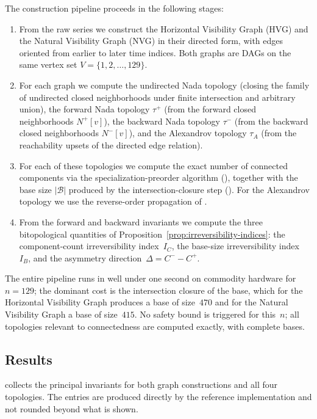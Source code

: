 \documentclass[11pt,a4paper]{article}
\theoremstyle{plain}
\theoremstyle{definition}
\newcommand{\Nfwd}[1]{N^{+}[#1]}
\newcommand{\Nbwd}[1]{N^{-}[#1]}
\newcommand{\taufwd}{\tau^{+}}
\newcommand{\taubwd}{\tau^{-}}
\newcommand{\base}{\mathcal{B}}
\begin{document}
The construction pipeline proceeds in the following stages:
\begin{enumerate}[label=(\roman*), leftmargin=2em]
\item From the raw series we construct the Horizontal Visibility Graph
(HVG) and the Natural Visibility Graph (NVG) in their directed form,
with edges oriented from earlier to later time indices. Both graphs are
DAGs on the same vertex set $V = \{1, 2, \ldots, 129\}$.
\item For each graph we compute the undirected Nada topology (closing
the family of undirected closed neighborhoods under finite intersection
and arbitrary union), the forward Nada topology $\taufwd$ (from the
forward closed neighborhoods $\Nfwd{v}$), the backward Nada topology
$\taubwd$ (from the backward closed neighborhoods $\Nbwd{v}$), and the
Alexandrov topology $\tau_A$ (from the reachability upsets of the
directed edge relation).
\item For each of these topologies we compute the exact number of
connected components via the specialization-preorder algorithm
(), together with the base size
$|\base|$ produced by the intersection-closure step
(). For the Alexandrov topology we use
the reverse-order propagation of
.
\item From the forward and backward invariants we compute the three
bitopological quantities of Proposition~\ref{prop:irreversibility-indices}:
the component-count irreversibility index~$I_C$, the base-size
irreversibility index~$I_B$, and the asymmetry direction~$\Delta = C^-
- C^+$.
\end{enumerate}
The entire pipeline runs in well under one second on commodity hardware
for $n = 129$; the dominant cost is the intersection closure of the base,
which for the Horizontal Visibility Graph produces a base of size~$470$
and for the Natural Visibility Graph a base of size~$415$. No safety
bound is triggered for this~$n$; all topologies relevant to connectedness
are computed exactly, with complete bases.

\subsection{Results}\label{subsec:results}

 collects the principal invariants for both graph
constructions and all four topologies. The entries are produced directly
by the reference implementation and not rounded beyond what is shown.
\end{document}
